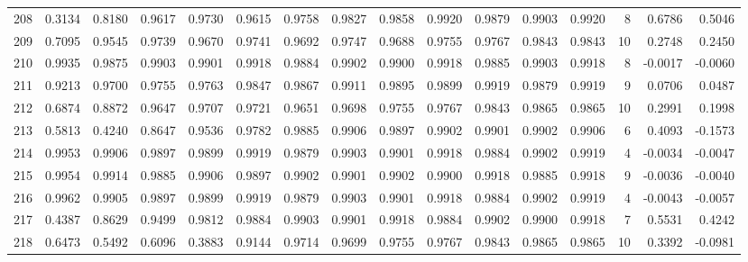 \begin{tabular}{lrrrrrrrrrrrrrrr}
208 &      0.3134 &  0.8180 &  0.9617 &  0.9730 &  0.9615 &  0.9758 &  0.9827 &  0.9858 &  0.9920 &  0.9879 &   0.9903 &     0.9920 &      8 &                    0.6786 &                     0.5046 \\
209 &      0.7095 &  0.9545 &  0.9739 &  0.9670 &  0.9741 &  0.9692 &  0.9747 &  0.9688 &  0.9755 &  0.9767 &   0.9843 &     0.9843 &     10 &                    0.2748 &                     0.2450 \\
210 &      0.9935 &  0.9875 &  0.9903 &  0.9901 &  0.9918 &  0.9884 &  0.9902 &  0.9900 &  0.9918 &  0.9885 &   0.9903 &     0.9918 &      8 &                   -0.0017 &                    -0.0060 \\
211 &      0.9213 &  0.9700 &  0.9755 &  0.9763 &  0.9847 &  0.9867 &  0.9911 &  0.9895 &  0.9899 &  0.9919 &   0.9879 &     0.9919 &      9 &                    0.0706 &                     0.0487 \\
212 &      0.6874 &  0.8872 &  0.9647 &  0.9707 &  0.9721 &  0.9651 &  0.9698 &  0.9755 &  0.9767 &  0.9843 &   0.9865 &     0.9865 &     10 &                    0.2991 &                     0.1998 \\
213 &      0.5813 &  0.4240 &  0.8647 &  0.9536 &  0.9782 &  0.9885 &  0.9906 &  0.9897 &  0.9902 &  0.9901 &   0.9902 &     0.9906 &      6 &                    0.4093 &                    -0.1573 \\
214 &      0.9953 &  0.9906 &  0.9897 &  0.9899 &  0.9919 &  0.9879 &  0.9903 &  0.9901 &  0.9918 &  0.9884 &   0.9902 &     0.9919 &      4 &                   -0.0034 &                    -0.0047 \\
215 &      0.9954 &  0.9914 &  0.9885 &  0.9906 &  0.9897 &  0.9902 &  0.9901 &  0.9902 &  0.9900 &  0.9918 &   0.9885 &     0.9918 &      9 &                   -0.0036 &                    -0.0040 \\
216 &      0.9962 &  0.9905 &  0.9897 &  0.9899 &  0.9919 &  0.9879 &  0.9903 &  0.9901 &  0.9918 &  0.9884 &   0.9902 &     0.9919 &      4 &                   -0.0043 &                    -0.0057 \\
217 &      0.4387 &  0.8629 &  0.9499 &  0.9812 &  0.9884 &  0.9903 &  0.9901 &  0.9918 &  0.9884 &  0.9902 &   0.9900 &     0.9918 &      7 &                    0.5531 &                     0.4242 \\
218 &      0.6473 &  0.5492 &  0.6096 &  0.3883 &  0.9144 &  0.9714 &  0.9699 &  0.9755 &  0.9767 &  0.9843 &   0.9865 &     0.9865 &     10 &                    0.3392 &                    -0.0981 \\

\end{tabular}
